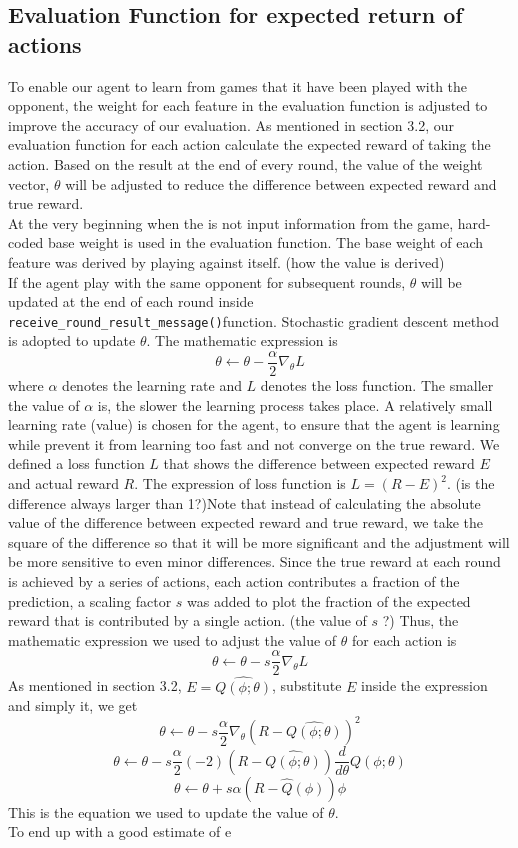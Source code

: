 \documentclass{article}
\begin{document}
\subsection{Evaluation Function for expected return of actions}
To enable our agent to learn from games that it have been played with the opponent, the weight for each feature in the evaluation function is adjusted to improve the accuracy of our evaluation. As mentioned in section 3.2, our evaluation function for each action calculate the expected reward of taking the action. Based on the result at the end of every round, the value of the weight vector, $\theta$ will be adjusted to reduce the difference between expected reward and true reward.
\\At the very beginning when the is not input information from the game, hard-coded base weight is used in the evaluation function. The base weight of each feature was derived by  playing against itself. (how the value is derived)
\\If the agent play with the same opponent for subsequent rounds, $\theta$ will be updated at the end of each round inside \verb|receive_round_result_message()|function. Stochastic gradient descent method is adopted to update $\theta$. The mathematic expression is \[\theta \leftarrow \theta - \frac{\alpha}{2} \nabla_\theta L\] where $\alpha$ denotes the learning rate and $L$ denotes the loss function. The smaller the value of $\alpha$ is, the slower the learning process takes place. A relatively small learning rate (value) is chosen for the agent, to ensure that the agent is learning while prevent it from learning too fast and not converge on the true reward. We defined a loss function $L$ that shows the difference between expected reward $E$ and actual reward $R$. The expression of loss function is $L=(R-E)^2$. (is the difference always larger than 1?)Note that instead of calculating the absolute value of the difference between expected reward and true reward, we take the square of the difference so that it will be more significant and the adjustment will be more sensitive to even minor differences. Since the true reward at each round is achieved by a series of actions, each action contributes a fraction of the prediction, a scaling factor $s$ was added to plot the fraction of the expected reward that is contributed by a single action. (the value of $s$ ?) Thus, the mathematic expression we used to adjust the value of $\theta$ for each action is \[\theta \leftarrow \theta -s \frac{\alpha}{2} \nabla_\theta L\] As mentioned in section 3.2, $E=\hat{Q(\phi;\theta)}$, substitute $E$ inside the expression and simply it, we get \[\theta \leftarrow \theta -s \frac{\alpha}{2} \nabla_\theta (R - \hat{Q(\phi;\theta)})^2\] \[\theta \leftarrow \theta -s \frac{\alpha}{2} (-2) (R - \hat{Q(\phi;\theta)}) \frac{d}{d\theta} Q(\phi;\theta)\]\[\theta \leftarrow \theta + s\alpha (R - \hat{Q}(\phi)) \phi\] This is the equation we used to update the value of $\theta$.
\\To end up with a good estimate of e
\end{document}
